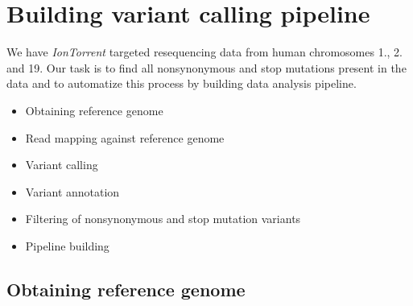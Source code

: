 \section{Building variant calling pipeline}
We have \textit{IonTorrent} targeted resequencing data from human chromosomes 1., 2. and 19. 
Our task is to find all nonsynonymous and stop mutations present in the data
and to automatize this process by building data analysis pipeline.

\begin{itemize}
  \item Obtaining reference genome
  \item Read mapping against reference genome
  \item Variant calling
  \item Variant annotation
  \item Filtering of nonsynonymous and stop mutation variants
  \item Pipeline building
\end{itemize}
\subsection{Obtaining reference genome}
